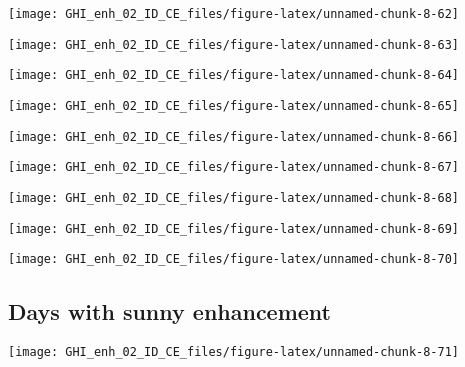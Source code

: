 \documentclass[
  10pt,
  a4paper,oneside]{article}
\begin{document}
\begin{center}\texttt{[image: GHI\_enh\_02\_ID\_CE\_files/figure-latex/unnamed-chunk-8-62]} \end{center}

\begin{center}\texttt{[image: GHI\_enh\_02\_ID\_CE\_files/figure-latex/unnamed-chunk-8-63]} \end{center}

\begin{center}\texttt{[image: GHI\_enh\_02\_ID\_CE\_files/figure-latex/unnamed-chunk-8-64]} \end{center}

\begin{center}\texttt{[image: GHI\_enh\_02\_ID\_CE\_files/figure-latex/unnamed-chunk-8-65]} \end{center}

\begin{center}\texttt{[image: GHI\_enh\_02\_ID\_CE\_files/figure-latex/unnamed-chunk-8-66]} \end{center}

\begin{center}\texttt{[image: GHI\_enh\_02\_ID\_CE\_files/figure-latex/unnamed-chunk-8-67]} \end{center}

\begin{center}\texttt{[image: GHI\_enh\_02\_ID\_CE\_files/figure-latex/unnamed-chunk-8-68]} \end{center}

\begin{center}\texttt{[image: GHI\_enh\_02\_ID\_CE\_files/figure-latex/unnamed-chunk-8-69]} \end{center}

\begin{center}\texttt{[image: GHI\_enh\_02\_ID\_CE\_files/figure-latex/unnamed-chunk-8-70]} \end{center}

\FloatBarrier

\hypertarget{days-with-sunny-enhancement}{%
\subsection{Days with sunny enhancement}\label{days-with-sunny-enhancement}}

\begin{center}\texttt{[image: GHI\_enh\_02\_ID\_CE\_files/figure-latex/unnamed-chunk-8-71]} \end{center}
\end{document}
